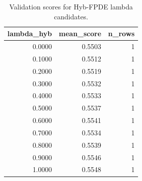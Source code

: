 \begin{table}[t]
\caption{Validation scores for Hyb-FPDE lambda candidates.}
\label{tab:lambda_distribution_computed}
\centering
\begin{tabular}{rrr}
\toprule
lambda\_hyb & mean\_score & n\_rows \\
\midrule
0.0000 & 0.5503 & 1 \\
0.1000 & 0.5512 & 1 \\
0.2000 & 0.5519 & 1 \\
0.3000 & 0.5532 & 1 \\
0.4000 & 0.5533 & 1 \\
0.5000 & 0.5537 & 1 \\
0.6000 & 0.5541 & 1 \\
0.7000 & 0.5534 & 1 \\
0.8000 & 0.5539 & 1 \\
0.9000 & 0.5546 & 1 \\
1.0000 & 0.5548 & 1 \\
\bottomrule
\end{tabular}

\end{table}
